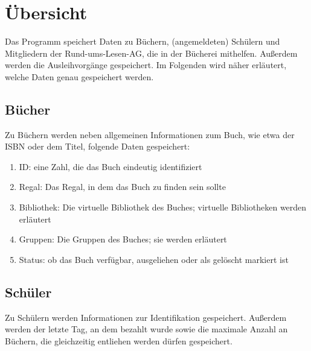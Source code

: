 




\maketitle
\newpage

\tableofcontents
\newpage


\section{Übersicht}
\label{sec:overview}
Das Programm speichert Daten zu Büchern, (angemeldeten) Schülern und Mitgliedern der Rund-ums-Lesen-AG, die in der Bücherei mithelfen. Außerdem werden die Ausleihvorgänge gespeichert. Im Folgenden wird näher erläutert, welche Daten genau gespeichert werden.

\subsection{Bücher}
\label{subsec:overview:books}
Zu Büchern werden neben allgemeinen Informationen zum Buch, wie etwa der ISBN oder dem Titel, folgende Daten gespeichert:

\begin{enumerate}
\item ID: eine Zahl, die das Buch eindeutig identifiziert
\item Regal: Das Regal, in dem das Buch zu finden sein sollte
\item Bibliothek: Die virtuelle Bibliothek des Buches; virtuelle Bibliotheken werden  erläutert
\item Gruppen: Die Gruppen des Buches; sie werden  erläutert
\item Status: ob das Buch verfügbar, ausgeliehen oder als gelöscht markiert ist
\end{enumerate}

\subsection{Schüler}
\label{subsec:overview:people}
Zu Schülern werden Informationen zur Identifikation gespeichert. Außerdem werden der letzte Tag, an dem bezahlt wurde sowie die maximale Anzahl an Büchern, die gleichzeitig entliehen werden dürfen gespeichert.

